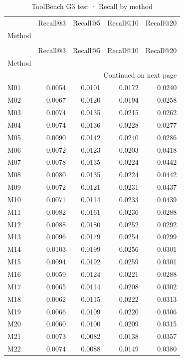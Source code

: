 \begin{longtable}{lrrrr}
\caption{ToolBench G3 test · Recall by method} \label{tab:ToolBench-G3-test-family-family-recall} \\
\toprule
 & Recall@3 & Recall@5 & Recall@10 & Recall@20 \\
Method &  &  &  &  \\
\midrule
\endfirsthead
\caption[]{ToolBench G3 test · Recall by method} \\
\toprule
 & Recall@3 & Recall@5 & Recall@10 & Recall@20 \\
Method &  &  &  &  \\
\midrule
\endhead
\midrule
\multicolumn{5}{r}{Continued on next page} \\
\midrule
\endfoot
\bottomrule
\endlastfoot
M01 & 0.0054 & 0.0101 & 0.0172 & 0.0240 \\
M02 & 0.0067 & 0.0120 & 0.0194 & 0.0258 \\
M03 & 0.0074 & 0.0135 & 0.0215 & 0.0262 \\
M04 & 0.0074 & 0.0136 & 0.0228 & 0.0277 \\
M05 & 0.0090 & 0.0142 & 0.0240 & 0.0286 \\
M06 & 0.0072 & 0.0123 & 0.0203 & 0.0418 \\
M07 & 0.0078 & 0.0135 & 0.0224 & 0.0442 \\
M08 & 0.0080 & 0.0135 & 0.0224 & 0.0442 \\
M09 & 0.0072 & 0.0121 & 0.0231 & 0.0437 \\
M10 & 0.0071 & 0.0114 & 0.0233 & 0.0439 \\
M11 & 0.0082 & 0.0161 & 0.0236 & 0.0288 \\
M12 & 0.0088 & 0.0180 & 0.0252 & 0.0292 \\
M13 & 0.0096 & 0.0179 & 0.0254 & 0.0299 \\
M14 & 0.0103 & 0.0199 & 0.0256 & 0.0301 \\
M15 & 0.0094 & 0.0192 & 0.0259 & 0.0301 \\
M16 & 0.0059 & 0.0124 & 0.0221 & 0.0288 \\
M17 & 0.0065 & 0.0114 & 0.0208 & 0.0302 \\
M18 & 0.0062 & 0.0115 & 0.0222 & 0.0313 \\
M19 & 0.0066 & 0.0109 & 0.0220 & 0.0306 \\
M20 & 0.0060 & 0.0100 & 0.0209 & 0.0315 \\
M21 & 0.0073 & 0.0082 & 0.0138 & 0.0357 \\
M22 & 0.0074 & 0.0088 & 0.0149 & 0.0380 \\

\end{longtable}
